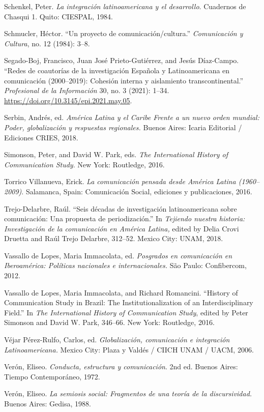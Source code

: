 \documentclass{tufte-handout}
\begin{document}
\begin{hangparas}{.25in}{1}
Schenkel, Peter. \emph{La integración latinoamericana y el desarrollo}.
Cuadernos de Chasqui 1. Quito: CIESPAL, 1984.

Schmucler, Héctor. ``Un proyecto de comunicación/cultura.''
\emph{Comunicación y Cultura}, no. 12 (1984): 3--8.

Segado-Boj, Francisco, Juan José Prieto-Gutiérrez, and Jesús Díaz-Campo.
``Redes de coautorías de la investigación Española y Latinoamericana en
comunicación (2000--2019): Cohesión interna y aislamiento
transcontinental.'' \emph{Profesional de la Información} 30, no. 3
(2021): 1--34. \url{https://doi.org/10.3145/epi.2021.may.05}.

Serbin, Andrés, ed. \emph{América Latina y el Caribe Frente a un nuevo
orden mundial: Poder, globalización y respuestas regionales.} Buenos
Aires: Icaria Editorial / Ediciones CRIES, 2018.

Simonson, Peter, and David W. Park, eds. \emph{The International History
of Communication Study}. New York: Routledge, 2016.

Torrico Villanueva, Erick. \emph{La comunicación pensada desde América
Latina (1960--2009)}. Salamanca, Spain: Comunicación Social, ediciones y
publicaciones, 2016.

Trejo-Delarbre, Raúl. ``Seis décadas de investigación latinoamericana
sobre comunicación: Una propuesta de periodización.'' In \emph{Tejiendo
nuestra historia: Investigación de la comunicación en América Latina,}
edited by Delia Crovi Druetta and Raúl Trejo Delarbre, 312--52. Mexico
City: UNAM, 2018.

Vassallo de Lopes, Maria Immacolata, ed. \emph{Posgrados en comunicación
en Iberoamérica: Políticas nacionales e internacionales.} São Paulo:
Confibercom, 2012.

Vassallo de Lopes, Maria Immacolata, and Richard Romancini. ``History of
Communication Study in Brazil: The Institutionalization of an
Interdisciplinary Field.'' In \emph{The International History of
Communication Study}, edited by Peter Simonson and David W. Park,
346--66. New York: Routledge, 2016.

Véjar Pérez-Rulfo, Carlos, ed. \emph{Globalización, comunicación e
integración Latinoamericana.} Mexico City: Plaza y Valdés / CIICH UNAM /
UACM, 2006.

Verón, Eliseo. \emph{Conducta, estructura y comunicación}. 2nd ed.
Buenos Aires: Tiempo Contemporáneo, 1972.

Verón, Eliseo. \emph{La semiosis social: Fragmentos de una teoría de la
discursividad.} Buenos Aires: Gedisa, 1988.


\end{hangparas}
\end{document}
